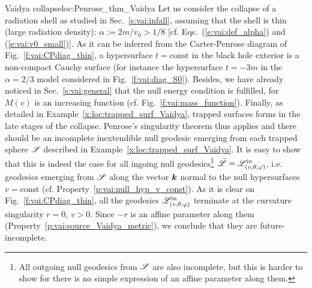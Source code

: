 \begin{texample}{Vaidya collapse}{loc:Penrose_thm_Vaidya}
Let us consider the collapse of a radiation shell
as studied in Sec.~\ref{s:vai:infall}, assuming that the shell is thin
(large radiation density): $\alpha := 2m/v_0 > 1/8$
[cf. Eqs.~(\ref{e:vai:def_alpha}) and (\ref{e:vai:v0_small})].
As it can be inferred from the Carter-Penrose diagram of Fig.~\ref{f:vai:CPdiag_thin},
a hypersurface $t=\mathrm{const}$ in the black hole exterior
is a non-compact Cauchy surface (for instance the hypersurface $t=-3m$ in
the $\alpha=2/3$ model considered in Fig.~\ref{f:vai:diag_S0}).
Besides, we have already noticed in Sec.~\ref{s:vai:general} that the null energy
condition is fulfilled, for $M(v)$ is an increasing function (cf. Fig.~\ref{f:vai:mass_function}).
Finally, as detailed in Example~\ref{x:loc:trapped_surf_Vaidya},
trapped surfaces forms in the late stages of the collapse.
Penrose's singularity theorem thus applies and there should be
an incomplete inextendible null geodesic emerging from each trapped sphere $\mathscr{S}$
described in Example~\ref{x:loc:trapped_surf_Vaidya}.
It is easy to show that this is indeed the case for all ingoing null geodesics\footnote{All outgoing
null geodesics from $\mathscr{S}$ are also incomplete, but this is harder to show for there is no simple
expression of an affine parameter along them.}
$\bar{\mathscr{L}} = \mathscr{L}^{\rm in}_{(v,\theta,\varphi)}$, i.e. geodesics emerging from $\mathscr{S}$ along the vector $\bm{k}$
normal to the null hypersurfaces $v=\mathrm{const}$ (cf. Property~\ref{p:vai:null_hyp_v_const}).
As it is clear on Fig.~\ref{f:vai:CPdiag_thin}, all the geodesics $\mathscr{L}^{\rm in}_{(v,\theta,\varphi)}$
terminate at the curvature singularity $r=0$, $v>0$. Since $-r$ is an affine parameter along
them (Property~\ref{p:vai:source_Vaidya_metric}), we conclude that they are future-incomplete.
\end{texample}

